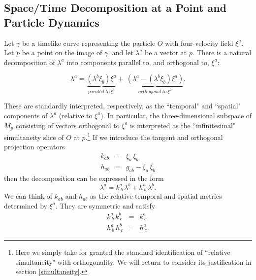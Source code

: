 \documentclass [12] {article}
\theoremstyle{plain}
\numberwithin{figure}{subsection}
\numberwithin{proposition}{subsection}
\begin{document}
\subsection{Space/Time Decomposition at a Point and Particle Dynamics} \label{Sp-Time Decomp}

Let $\gamma$ be a timelike curve representing the particle $O$ with four-velocity field $\xi^a$.   Let $p$ be a point on the image of $\gamma$, and let $\lambda^a$ be a vector at $p$.   There is a natural decomposition of $\lambda^a$ into components parallel to, and orthogonal to, $\xi^a$:

\begin{equation}
\label{vectordecomposition}
\lambda^a  =   \underbrace{(\lambda^b \xi_b) \xi^a}_{parallel \ to \ \xi^a}   +  \  \underbrace{(\lambda^a - (\lambda^b \xi_b) \xi^a)}_{orthogonal \ to \ \xi^a} . 
\end{equation}
 
\noindent These are standardly interpreted, respectively, as the ``temporal" and ``spatial" components of  $\lambda^a$ (relative to $\xi^a$).  In particular, the three-dimensional subspace of $M_p$ consisting of  vectors orthogonal to $\xi^a$  is interpreted as the ``infinitesimal" simultaneity slice of $O$ at $p$.\footnote{Here we simply take for granted the standard identification  of  ``relative simultaneity" with orthogonality. We will return to consider its justification in section \ref{simultaneity}. }   %
%
%
\noindent If we introduce the tangent and orthogonal projection operators
\vspace{-1em}
\begin{eqnarray}
k_{ab} & = &  \xi_a \, \xi_b     \label{def k}\\
h_{ab} & = & g_{ab} -  \xi_a  \, \xi_b   \label{def h} 
\end{eqnarray}
then the decomposition can be  expressed in the form
\begin{equation}
\label{}
\lambda^a  =      k^a_{\ b} \, \lambda^b   +  h^a_{\ b}  \, \lambda^b.  \label{second vector decomposition}
\end{equation}
We can think of $k_{ab}$ and $h_{ab}$ as the relative temporal and spatial metrics determined by $\xi^a$. They are symmetric and satisfy
%
\begin{eqnarray}
k^a_{\ b} \, k^b_{\ c} & = &  k^a_{\ c}     \label{multiple k}\\ 
h^a_{\ b} \, h^b_{\ c} & = &  h^a_{\ c}.  \label{multiple h}
\end{eqnarray}
\end{document}
